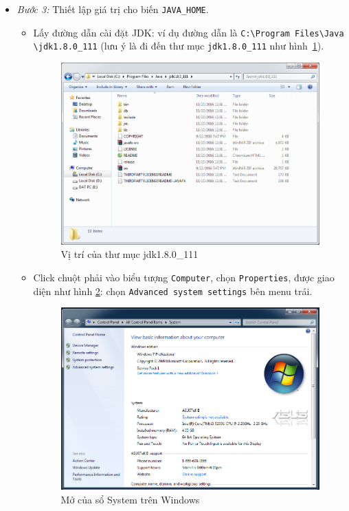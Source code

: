 \documentclass[13pt,a4paper]{extreport}
\begin{document}
\begin{itemize}
		\newpage			
		\item \textit{Bước 3:} Thiết lập giá trị cho biến \verb|JAVA_HOME|.
			\begin{itemize}
				\item Lấy đường dẫn cài đặt JDK: ví dụ đường dẫn là \verb|C:\Program Files\Java| \verb|\jdk1.8.0_111| (lưu ý là đi đến thư mục \verb|jdk1.8.0_111| như hình~\ref{Fig:local-jdk}).
					\begin{figure}[!h]
						\begin{center}
							\includegraphics[scale=.5]{local-jdk.png} 
						\end{center}
						\caption{Vị trí của thư mục jdk1.8.0\_111}
						\label{Fig:local-jdk}
					\end{figure}
					
				\item Click chuột phải vào biểu tượng \verb|Computer|, chọn \verb|Properties|, được giao diện như hình \ref{Fig:setup-JDK-JAVA-HOME-1}: chọn \verb|Advanced system settings| bên menu trái.
					\begin{figure}[!h]
						\begin{center}
							\includegraphics[scale=.5]{setup-JDK-JAVA-HOME-1.png}
						\end{center}
						\caption{Mở của sổ System trên Windows}
						\label{Fig:setup-JDK-JAVA-HOME-1}
					\end{figure}
					

\end{itemize}
\end{itemize}
\end{document}
